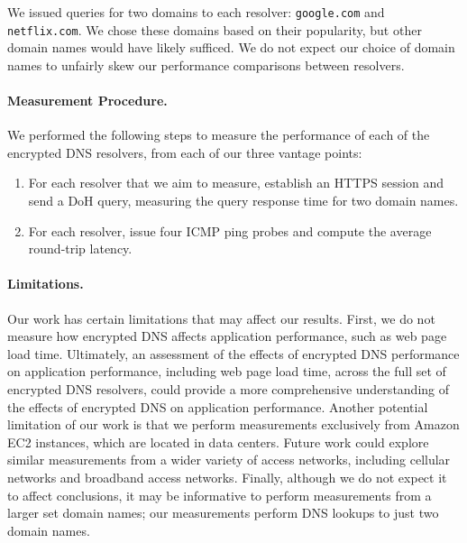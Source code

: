 We issued queries for two domains to each resolver: \texttt{google.com} and
\texttt{netflix.com}.  We chose these domains based on their popularity, but
other domain names would have likely sufficed.  We do not expect our choice of
domain names to unfairly skew our performance comparisons between resolvers.

\paragraph{Measurement Procedure.} We performed the following steps to measure
the performance of each of the encrypted DNS resolvers, from each of our three vantage points:
\begin{enumerate} 
        \item For each
            resolver that we aim to measure, establish an HTTPS session and
            send a DoH query, measuring the query response time for two
            domain names.
    \item For each resolver, issue four ICMP ping
            probes and compute the average round-trip latency. 
\end{enumerate}

\paragraph{Limitations.} Our work has certain limitations that may affect our
results.  First, we do not measure how encrypted DNS affects application
performance, such as web page load time. Ultimately, an assessment of the
effects of encrypted DNS performance on application performance, including web
page load time, across the full set of encrypted DNS resolvers, could provide
a more comprehensive understanding of the effects of encrypted DNS on
application performance.  Another potential limitation of our work is that we
perform measurements exclusively from Amazon EC2 instances, which are located
in data centers. Future work could explore similar measurements from a wider
variety of access networks, including cellular networks and broadband access
networks.  Finally, although we do not expect it to affect conclusions, it may
be informative to perform measurements from a larger set domain names; our
measurements perform DNS lookups to just two domain names.
